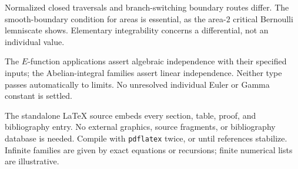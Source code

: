 \documentclass[11pt,a4paper]{article}
\theoremstyle{definition}
\theoremstyle{remark}
\numberwithin{equation}{section}
\begin{document}
Normalized closed traversals and branch-switching boundary routes differ.
The smooth-boundary condition for areas is essential, as the area-$2$
critical Bernoulli lemniscate shows. Elementary integrability concerns
a differential, not an individual value.

The $E$-function applications assert algebraic independence with their
specified inputs; the Abelian-integral families assert linear independence.
Neither type passes automatically to limits. No unresolved individual
Euler or Gamma constant is settled.

The standalone \LaTeX{} source embeds every section, table, proof, and
bibliography entry. No external graphics, source fragments, or bibliography
database is needed. Compile with \texttt{pdflatex} twice, or until references
stabilize. Infinite families are given by exact equations or recursions;
finite numerical lists are illustrative.
\end{document}
